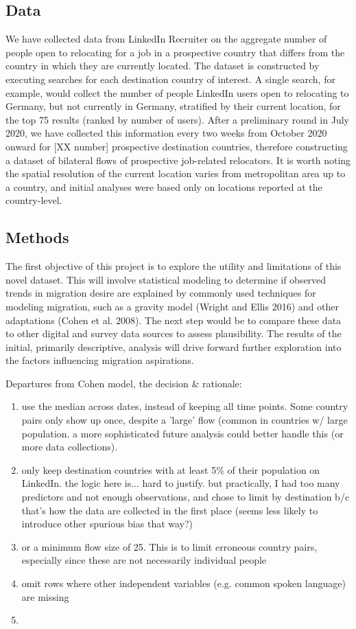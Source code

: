 \subsection*{Data}
We have collected data from LinkedIn Recruiter on the aggregate number of people open to relocating for a job in a prospective country that differs from the country in which they are currently located. The dataset is constructed by executing searches for each destination country of interest. A single search, for example, would collect the number of people LinkedIn users open to relocating to Germany, but not currently in Germany, stratified by their current location, for the top 75 results (ranked by number of users). After a preliminary round in July 2020, we have collected this information every two weeks from October 2020 onward for [XX number] prospective destination countries, therefore constructing a dataset of bilateral flows of prospective job-related relocators. It is worth noting the spatial resolution of the current location varies from metropolitan area up to a country, and initial analyses were based only on locations reported at the country-level.

\subsection*{Methods}
The first objective of this project is to explore the utility and limitations of this novel dataset. This will involve statistical modeling to determine if observed trends in migration desire are explained by commonly used techniques for modeling migration, such as a gravity model (Wright and Ellis 2016) and other adaptations (Cohen et al. 2008). The next step would be to compare these data to other digital and survey data sources to assess plausibility. The results of the initial, primarily descriptive, analysis will drive forward further exploration into the factors influencing migration aspirations.

Departures from Cohen model, the decision \& rationale:
\begin{enumerate}
    \item use the median across dates, instead of keeping all time points. Some country pairs only show up once, despite a 'large' flow (common in countries w/ large population. a more sophisticated future analysis could better handle this (or more data collections).
    \item only keep destination countries with at least 5\% of their population on LinkedIn. the logic here is... hard to justify. but practically, I had too many predictors and not enough observations, and chose to limit by destination b/c that's how the data are collected in the first place (seems less likely to introduce other spurious bias that way?)
    \item or a minimum flow size of 25. This is to limit erroneous country pairs, especially since these are not necessarily individual people
    \item omit rows where other independent variables (e.g. common spoken language) are missing
    \item 
\end{enumerate}

